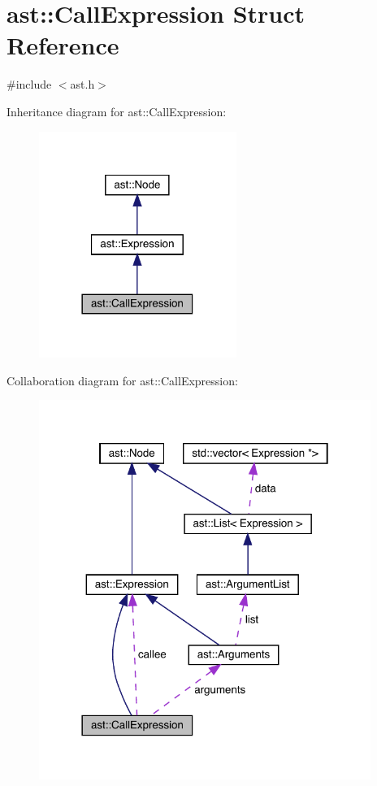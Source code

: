 \hypertarget{structast_1_1_call_expression}{}\section{ast\+:\+:Call\+Expression Struct Reference}
\label{structast_1_1_call_expression}


{\ttfamily \#include $<$ast.\+h$>$}



Inheritance diagram for ast\+:\+:Call\+Expression\+:
\nopagebreak
\begin{figure}[H]
\begin{center}
\leavevmode
\includegraphics[width=182pt]{structast_1_1_call_expression__inherit__graph}
\end{center}
\end{figure}


Collaboration diagram for ast\+:\+:Call\+Expression\+:
\nopagebreak
\begin{figure}[H]
\begin{center}
\leavevmode
\includegraphics[width=306pt]{structast_1_1_call_expression__coll__graph}
\end{center}
\end{figure}
